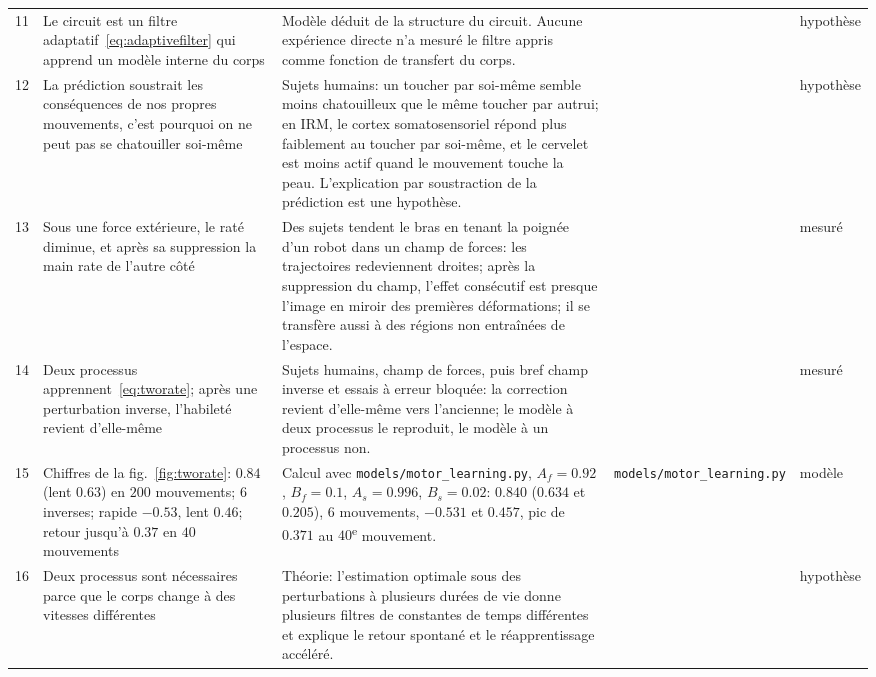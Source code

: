 {\begin{longtable}{>{\raggedright}p{0.5cm}>{\raggedright}p{4.0cm}>{\raggedright}p{5.6cm}>{\raggedright}p{2.3cm}>{\raggedright\arraybackslash}p{1.7cm}}
11 & Le circuit est un filtre adaptatif~\eqref{eq:adaptivefilter} qui apprend un modèle interne du corps & Modèle déduit de la structure du circuit. Aucune expérience directe n'a mesuré le filtre appris comme fonction de transfert du corps. & \cite{Fujita1982} & hypothèse \\
12 & La prédiction soustrait les conséquences de nos propres mouvements, c'est pourquoi on ne peut pas se chatouiller soi-même & Sujets humains: un toucher par soi-même semble moins chatouilleux que le même toucher par autrui; en IRM, le cortex somatosensoriel répond plus faiblement au toucher par soi-même, et le cervelet est moins actif quand le mouvement touche la peau. L'explication par soustraction de la prédiction est une hypothèse. & \cite{Blakemore1998} & hypothèse \\
13 & Sous une force extérieure, le raté diminue, et après sa suppression la main rate de l'autre côté & Des sujets tendent le bras en tenant la poignée d'un robot dans un champ de forces: les trajectoires redeviennent droites; après la suppression du champ, l'effet consécutif est presque l'image en miroir des premières déformations; il se transfère aussi à des régions non entraînées de l'espace. & \cite{ShadmehrMussaIvaldi1994} & mesuré \\
14 & Deux processus apprennent~\eqref{eq:tworate}; après une perturbation inverse, l'habileté revient d'elle-même & Sujets humains, champ de forces, puis bref champ inverse et essais à erreur bloquée: la correction revient d'elle-même vers l'ancienne; le modèle à deux processus le reproduit, le modèle à un processus non. & \cite{Smith2006} & mesuré \\
15 & Chiffres de la fig.~\ref{fig:tworate}: $0.84$ (lent $0.63$) en $200$ mouvements; $6$ inverses; rapide $-0.53$, lent $0.46$; retour jusqu'à $0.37$ en $40$ mouvements & Calcul avec \texttt{models/\allowbreak motor\_\allowbreak learning.py}, $A_f=0.92$, $B_f=0.1$, $A_s=0.996$, $B_s=0.02$: $0.840$ ($0.634$ et $0.205$), $6$ mouvements, $-0.531$ et $0.457$, pic de $0.371$ au $40$\textsuperscript{e} mouvement. & \texttt{models/\allowbreak motor\_\allowbreak learning.py} & modèle \\
16 & Deux processus sont nécessaires parce que le corps change à des vitesses différentes & Théorie: l'estimation optimale sous des perturbations à plusieurs durées de vie donne plusieurs filtres de constantes de temps différentes et explique le retour spontané et le réapprentissage accéléré. & \cite{Kording2007} & hypothèse \\
\bottomrule
\end{longtable}}

